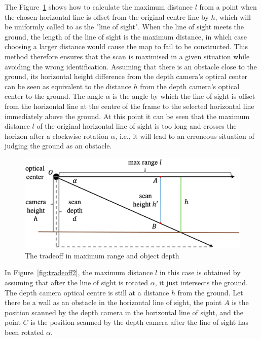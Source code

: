 
The Figure~\ref{fig:tradeoff} shows how to calculate the maximum distance $l$ from a point when the chosen horizontal line is offset from the original centre line by $h$, 
which will be uniformly called to as the "line of sight". 
When the line of sight meets the ground, the length of the line of sight is the maximum distance, 
in which case choosing a larger distance would cause the map to fail to be constructed. 
This method therefore ensures that the scan is maximised in a given situation while avoiding the wrong identification. 
Assuming that there is an obstacle close to the ground, 
its horizontal height difference from the depth camera's optical center can be seen as equivalent to the distance $h$ from the depth camera's optical center to the ground.
The angle $\alpha$ is the angle by which the line of sight is offset from the horizontal line at the centre of the frame to the selected horizontal line immediately above the ground. 
At this point it can be seen that the maximum distance $l$ of the original horizontal line of sight is too long and crosses the horizon after a clockwise rotation $\alpha$,
i.e., it will lead to an erroneous situation of judging the ground as an obstacle.

\begin{figure}[H]
    \centering
    \includegraphics[width=1.0\linewidth]{figs/tradeoff_1.png}
    \caption{The tradeoff in maximum range and object depth}
    \label{fig:tradeoff}
\end{figure}

In Figure~\ref{fig:tradeoff2}, the maximum distance $l$ in this case is obtained by assuming that after the line of sight is rotated $\alpha$, 
it just intersects the ground. The depth camera optical centre is still at a distance $h$ from the ground. 
Let there be a wall as an obstacle in the horizontal line of sight, the point $A$ is the position 
scanned by the depth camera in the horizontal line of sight, and the point $C$ is the position 
scanned by the depth camera after the line of sight has been rotated $\alpha$.

